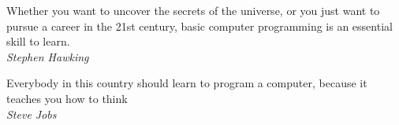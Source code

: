 \documentclass[
    trieste,
    corpo=11pt,
    twoside,
    evenboxes,
]{toptesi}
\begin{document}

\begin{flushright}
  \noindent
  Whether you want to uncover the secrets of the universe, or you just want to pursue a career in the 21st century, basic computer programming is an essential skill to learn.\\
  \vspace{5px}
  \small{\textit{Stephen Hawking}}
\end{flushright}
\begin{flushright}
  \noindent
  Everybody in this country should learn to program a computer, because it teaches you how to think\\
  \vspace{5px}
  \small{\textit{Steve Jobs}}
\end{flushright}
\cleardoublepage


\ringraziamenti

\end{document}
